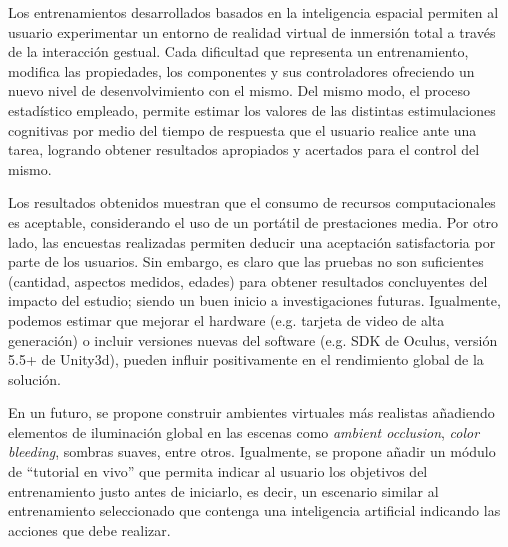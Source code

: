 \documentclass[conference]{IEEEtran}
\begin{document}
Los entrenamientos desarrollados basados en la inteligencia espacial permiten al usuario experimentar un entorno de realidad virtual de inmersión total a través de la interacción gestual. Cada dificultad que representa un entrenamiento, modifica las propiedades, los componentes y sus controladores ofreciendo un nuevo nivel de desenvolvimiento con el mismo. Del mismo modo, el proceso estadístico empleado, permite estimar los valores de las distintas estimulaciones cognitivas por medio del tiempo de respuesta que el usuario realice ante una tarea, logrando obtener resultados apropiados y acertados para el control del mismo.

Los resultados obtenidos muestran que el consumo de recursos computacionales es aceptable, considerando el uso de un portátil de prestaciones media. Por otro lado, las encuestas realizadas permiten deducir una aceptación satisfactoria por parte de los usuarios. Sin embargo, es claro que las pruebas no son suficientes (cantidad, aspectos medidos, edades) para obtener resultados concluyentes del impacto del estudio; siendo un buen inicio a investigaciones futuras. Igualmente, podemos estimar que mejorar el hardware (e.g. tarjeta de video de alta generación) o incluir versiones nuevas del software (e.g. SDK de Oculus, versión 5.5+ de Unity3d), pueden influir positivamente en el rendimiento global de la solución. 

En un futuro, se propone construir ambientes virtuales más realistas añadiendo elementos de iluminación global en las escenas como \textit{ambient occlusion}, \textit{color bleeding}, sombras suaves, entre otros. Igualmente, se propone añadir un módulo de ``tutorial en vivo'' que permita indicar al usuario los objetivos del entrenamiento justo antes de iniciarlo, es decir, un escenario similar al entrenamiento seleccionado que contenga una inteligencia artificial indicando las acciones que debe realizar.




\end{document}
